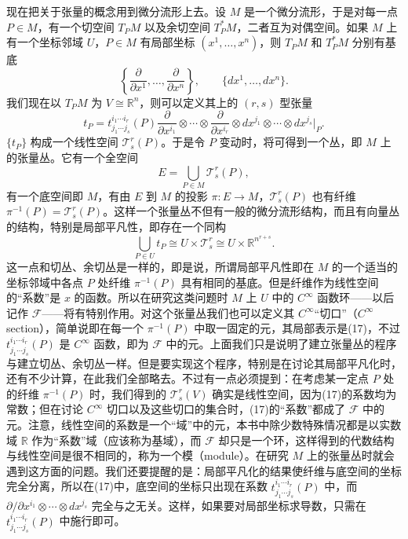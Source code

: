 现在把关于张量的概念用到微分流形上去。设 $M$ 是一个微分流形，于是对每一点 $P\in M$，有一个切空间 $T_PM$ 以及余切空间 $T_P^*M$，二者互为对偶空间。如果 $M$ 上有一个坐标邻域 $U$，\linebreak[2] $P\in M$ 有局部坐标 $(x^1,\ldots,x^n)$，则 $T_PM$ 和 $T_P^*M$ 分别有基底
\[
 \left\{\frac{\partial}{\partial x^1},\ldots,\frac{\partial}{\partial x^n}\right\},
 \qquad \{dx^1,\ldots,dx^n\}.
\]
我们现在以 $T_PM$ 为 $V\cong\mathbb R^n$，则可以定义其上的 $(r,s)$ 型张量
\begin{equation}
 t_P=t^{i_1\cdots i_r}_{j_1\cdots j_s}(P)
 \frac{\partial}{\partial x^{i_1}}\otimes\cdots\otimes\frac{\partial}{\partial x^{i_r}}
 \otimes dx^{j_1}\otimes\cdots\otimes dx^{j_s}\Big|_P.
 \tag{17}
\end{equation}
$\{t_P\}$ 构成一个线性空间 $\mathcal T^r_s(P)$。于是令 $P$ 变动时，将可得到一个丛，即 $M$ 上的张量丛。它有一个全空间
\[
 E=\bigcup_{P\in M}\mathcal T^r_s(P),
\]
有一个底空间即 $M$，有由 $E$ 到 $M$ 的投影 $\pi:E\to M$，$\mathcal T^r_s(P)$ 也有纤维 $\pi^{-1}(P)=\mathcal T^r_s(P)$。这样一个张量丛不但有一般的微分流形结构，而且有向量丛的结构，特别是局部平凡性，即存在一个同构
\[
 \left.\bigcup_{P\in U}t_P\right.\cong U\times\mathcal T^r_s\cong U\times\mathbb R^{n^{r+s}}.
\]
这一点和切丛、余切丛是一样的，即是说，所谓局部平凡性即在 $M$ 的一个适当的坐标邻域中各点 $P$ 处纤维 $\pi^{-1}(P)$ 具有相同的基底。但是纤维作为线性空间的“系数”是 $x$ 的函数。所以在研究这类问题时 $M$ 上 $U$ 中的 $C^\infty$ 函数环——以后记作 $\mathcal F$——将有特别作用。对这个张量丛我们也可以定义其 $C^\infty$“切口”（$C^\infty$ section），简单说即在每一个 $\pi^{-1}(P)$ 中取一固定的元，其局部表示是(17)，不过 $t^{i_1\cdots i_r}_{j_1\cdots j_s}(P)$ 是 $C^\infty$ 函数，即为 $\mathcal F$ 中的元。上面我们只是说明了建立张量丛的程序与建立切丛、余切丛一样。但是要实现这个程序，特别是在讨论其局部平凡化时，还有不少计算，在此我们全部略去。不过有一点必须提到：在考虑某一定点 $P$ 处的纤维 $\pi^{-1}(P)$ 时，我们得到的 $\mathcal T^r_s(V)$ 确实是线性空间，因为(17)的系数均为常数；但在讨论 $C^\infty$ 切口以及这些切口的集合时，(17)的“系数”都成了 $\mathcal F$ 中的元。注意，线性空间的系数是一个“域”中的元，本书中除少数特殊情况都是以实数域 $\mathbb R$ 作为“系数”域（应该称为基域），而 $\mathcal F$ 却只是一个环，这样得到的代数结构与线性空间是很不相同的，称为一个模（module）。在研究 $M$ 上的张量丛时就会遇到这方面的问题。我们还要提醒的是：局部平凡化的结果使纤维与底空间的坐标完全分离，所以在(17)中，底空间的坐标只出现在系数 $t^{i_1\cdots i_r}_{j_1\cdots j_s}(P)$ 中，而 $\partial/\partial x^{i_1}\otimes\cdots\otimes dx^{j_s}$ 完全与之无关。这样，如果要对局部坐标求导数，只需在 $t^{i_1\cdots i_r}_{j_1\cdots j_s}(P)$ 中施行即可。

